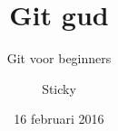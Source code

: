 \documentclass{beamer}
\title{Git gud}
\subtitle{Git voor beginners}
\author{Sticky}
\date{16 februari 2016}
\begin{document}
\frame{\titlepage}


\end{document}
